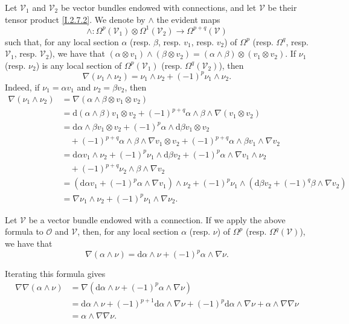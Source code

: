 \documentclass{report}
\theoremstyle{plain}
\theoremstyle{definition}
\newenvironment{env}[1]
    {\renewcommand\theinnercustomenv{#1}\innercustomenv}
    {\endinnercustomenv}
\newcommand{\sh}[1]{{\mathscr{#1}}}
\newcommand{\dd}{\mathrm{d}}
\newcommand{\oldpage}[1]{\marginpar{\footnotesize$\Big\vert$ \textit{p.~#1}}}
\begin{document}
\begin{env}{2.10}
  Let $\sh{V}_1$ and $\sh{V}_2$ be vector bundles endowed with connections, and let $\sh{V}$ be their tensor product \cref{I.2.7.2}.
  We denote by $\wedge$ the evident maps
  \[
    \wedge\colon \Omega^p(\sh{V}_1)\otimes\Omega^1(\sh{V}_2) \to \Omega^{p+q}(\sh{V})
  \]
\oldpage{10}
  such that, for any local section $\alpha$ (resp. $\beta$, resp. $v_1$, resp. $v_2$) of $\Omega^p$ (resp. $\Omega^q$, resp. $\sh{V}_1$, resp. $\sh{V}_2$), we have that $(\alpha\otimes v_1)\wedge(\beta\otimes v_2) = (\alpha\wedge\beta)\otimes(v_1\otimes v_2)$.
  If $\nu_1$ (resp. $\nu_2$) is any local section of $\Omega^p(\sh{V}_1)$ (resp. $\Omega^q(\sh{V}_2)$), then
  \[
  \label{I.2.10.3}
    \nabla(\nu_1\wedge\nu_2) = \nu_1\wedge\nu_2 + (-1)^p\nu_1\wedge\nu_2.
  \tag{2.10.3}
  \]
  Indeed, if $\nu_1=\alpha v_1$ and $\nu_2=\beta v_2$, then
  \[
    \begin{aligned}
      \nabla(\nu_1\wedge\nu_2)
      &= \nabla(\alpha\wedge\beta\otimes v_1\otimes v_2)
    \\&= \dd(\alpha\wedge\beta)v_1\otimes v_2 + (-1)^{p+q}\alpha\wedge\beta\wedge\nabla(v_1\otimes v_2)
    \\&= \dd\alpha\wedge\beta v_1\otimes v_2 + (-1)^p\alpha\wedge\dd\beta v_1\otimes v_2
    \\&\quad+ (-1)^{p+q}\alpha\wedge\beta\wedge\nabla v_1\otimes v_2 + (-1)^{p+q}\alpha\wedge\beta v_1\wedge\nabla v_2
    \\&= \dd\alpha v_1\wedge\nu_2 + (-1)^p\nu_1\wedge\dd\beta v_2 + (-1)^p\alpha\wedge\nabla v_1\wedge\nu_2
    \\&\quad+ (-1)^{p+q}\nu_2\wedge\beta\wedge\nabla v_2
    \\&= (\dd\alpha v_1 + (-1)^p\alpha\wedge\nabla v_1)\wedge\nu_2 + (-1)^p\nu_1\wedge(\dd\beta v_2 + (-1)^q\beta\wedge\nabla v_2)
    \\&= \nabla\nu_1\wedge\nu_2 +(-1)^p\nu_1\wedge\nabla\nu_2.
    \end{aligned}
  \]

  Let $\sh{V}$ be a vector bundle endowed with a connection.
  If we apply the above formula to $\sh{O}$ and $\sh{V}$, then, for any local section $\alpha$ (resp. $\nu$) of $\Omega^p$ (resp. $\Omega^q(\sh{V})$), we have that
  \[
  \label{I.2.10.4}
    \nabla(\alpha\wedge\nu) = \dd\alpha\wedge\nu + (-1)^p\alpha\wedge\nabla\nu.
  \tag{2.10.4}
  \]

  Iterating this formula gives
  \[
  \label{I.2.10.5}
    \begin{aligned}
      \nabla\nabla(\alpha\wedge\nu)
      &= \nabla(\dd\alpha\wedge\nu + (-1)^p\alpha\wedge\nabla\nu)
      \\&= \dd\alpha\wedge\nu + (-1)^{p+1}\dd\alpha\wedge\nabla\nu + (-1)^p\dd\alpha\wedge\nabla\nu + \alpha\wedge\nabla\nabla\nu
      \\&= \alpha\wedge\nabla\nabla\nu.
    \end{aligned}
  \tag{2.10.5}
  \]
\end{env}
\end{document}
